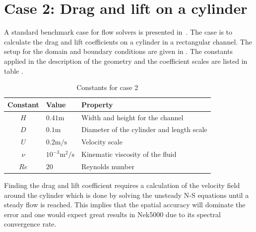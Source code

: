 

\section{Case 2: Drag and lift on a cylinder}
A standard benchmark case for flow solvers is presented in~\cite{benchmark}. 
The case is to calculate the drag and lift coefficients on a cylinder in a rectangular channel.
The setup for the domain and boundary conditions are given in .
The constants applied in the description of the geometry and the coefficient scales are listed 
in table .
%
\begin{table}[h]
    \centering
    \begin{tabular}{c l l}
     Constant & Value & Property \\ \hline
    $H$ & $0.41\text{m}$ & Width and height for the channel \\
    $D$ & $0.1\text{m}$ & Diameter of the cylinder and length scale \\
    $U$ & $0.2\text{m/s}$ & Velocity scale \\
    $\nu$ &  $ 10^{-3}\text{m$^2$/s}$ & Kinematic viscosity of the fluid \\
    $Re$ & $20$ & Reynolds number \\ 
    \end{tabular}
    \caption{Constants for case 2}
    \label{tab:case2consts}
\end{table}
%
Finding the drag and lift coefficient requires a calculation of the velocity field around the cylinder
which is done by solving the unsteady N-S equations until a steady flow is reached. This implies that the
spatial accuracy will dominate the error and one would expect great results in Nek5000 
due to its spectral convergence rate.

